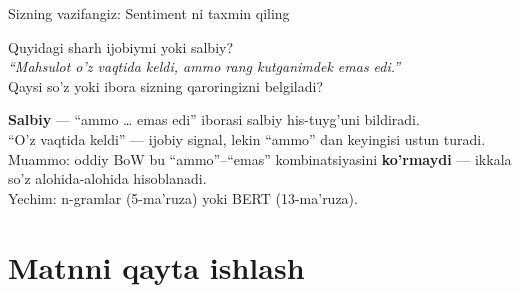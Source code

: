 \documentclass[aspectratio=169,11pt]{beamer}
\begin{document}
\begin{frame}{Sizning vazifangiz: Sentiment ni taxmin qiling}
  \begin{tcolorbox}[warnbox,title=Savol --- 30 soniya]
    \small
    Quyidagi sharh ijobiymi yoki salbiy?\\[4pt]
    \textit{``Mahsulot o'z vaqtida keldi, ammo rang kutganimdek emas edi.''}\\[4pt]
    Qaysi so'z yoki ibora sizning qaroringizni belgiladi?
  \end{tcolorbox}
  \pause
  \begin{tcolorbox}[okbox,title=Javob]
    \small
    \textbf{Salbiy} --- ``ammo \ldots{} emas edi'' iborasi salbiy his-tuyg'uni bildiradi.\\[3pt]
    ``O'z vaqtida keldi'' --- ijobiy signal, lekin ``ammo'' dan keyingisi ustun turadi.\\[3pt]
    \alert{Muammo}: oddiy BoW bu ``ammo''--``emas'' kombinatsiyasini \textbf{ko'rmaydi}
    --- ikkala so'z alohida-alohida hisoblanadi.\\
    Yechim: n-gramlar (5-ma'ruza) yoki BERT (13-ma'ruza).
  \end{tcolorbox}
\end{frame}

\section[Ishlov berish]{Matnni qayta ishlash}
\end{document}
